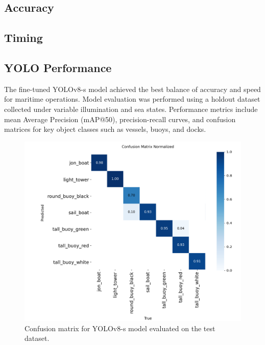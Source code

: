 \documentclass{erauthesis}
\begin{document}
\subsection{Accuracy} \label{classify_accuracy}
\subsection{Timing} \label{classify_timing}


\subsection{YOLO Performance} \label{performance_yolo}




The fine-tuned YOLOv8-s model achieved the best balance of accuracy and speed for maritime operations.
Model evaluation was performed using a holdout dataset collected under variable illumination and sea states.
Performance metrics include mean Average Precision (mAP@50), precision-recall curves, and confusion matrices for key object classes such as vessels, buoys, and docks.

\begin{figure}[htbp]
    \centering
    \includegraphics[width=0.8\linewidth]{Images/yolo/YOLO_training_results.png}
    \caption{Confusion matrix for YOLOv8-s model evaluated on the test dataset.}
    \label{fig:yolo_confusion_matrix}
\end{figure}

\end{document}
